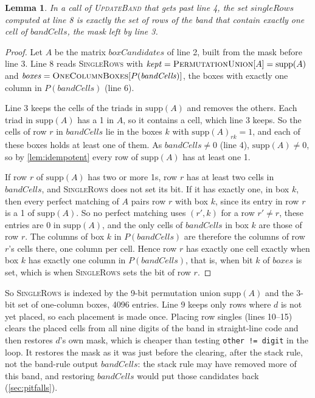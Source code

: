 \documentclass[11pt]{article}
\newtheorem{lemma}[theorem]{Lemma}
\theoremstyle{definition}
\theoremstyle{plain}
\let\origtextsc\textsc
\renewcommand{\textsc}[1]{\textup{\origtextsc{#1}}}
\begin{document}
\begin{lemma}
\label{lem:singlerows}
In a call of \textsc{UpdateBand} that gets past line 4, the set $\mathit{singleRows}$ computed at line 8 is exactly the
set of rows of the band that contain exactly one cell of $\mathit{bandCells}$, the mask left by line 3.
\end{lemma}
\begin{proof}
Let $A$ be the matrix $\mathit{boxCandidates}$ of line 2, built from the mask before line 3. Line 8 reads
\textsc{SingleRows} with $\mathit{kept}=\textsc{PermutationUnion}[A]=\mathrm{supp}(A)$ and
$\mathit{boxes}=\textsc{OneColumnBoxes}[P(\mathit{bandCells})]$, the boxes with exactly one column in
$P(\mathit{bandCells})$ (line 6).

Line 3 keeps the cells of the triads in $\mathrm{supp}(A)$ and removes the others. Each triad in $\mathrm{supp}(A)$ has
a 1 in $A$, so it contains a cell, which line 3 keeps. So the cells of row $r$ in $\mathit{bandCells}$ lie in the boxes
$k$ with $\mathrm{supp}(A)_{rk}=1$, and each of these boxes holds at least one of them. As $\mathit{bandCells}\neq 0$
(line 4), $\mathrm{supp}(A)\neq 0$, so by \cref{lem:idempotent} every row of $\mathrm{supp}(A)$ has at least one 1.

If row $r$ of $\mathrm{supp}(A)$ has two or more 1s, row $r$ has at least two cells in $\mathit{bandCells}$, and
\textsc{SingleRows} does not set its bit. If it has exactly one, in box $k$, then every perfect matching of $A$ pairs
row $r$ with box $k$, since its entry in row $r$ is a 1 of $\mathrm{supp}(A)$. So no perfect matching uses $(r',k)$
for a row $r'\neq r$, these entries are 0 in $\mathrm{supp}(A)$, and the only cells of $\mathit{bandCells}$ in box $k$
are those of row $r$. The columns of box $k$ in $P(\mathit{bandCells})$ are therefore the columns of row $r$'s cells
there, one column per cell. Hence row $r$ has exactly one cell exactly when box $k$ has exactly one column in
$P(\mathit{bandCells})$, that is, when bit $k$ of $\mathit{boxes}$ is set, which is when \textsc{SingleRows} sets the
bit of row $r$.
\end{proof}

\noindent So \textsc{SingleRows} is indexed by the 9-bit permutation union $\mathrm{supp}(A)$ and the 3-bit set of one-column boxes, 4096
entries. Line 9 keeps only rows where $d$ is not yet placed, so each placement is made once. Placing row singles (lines 10--15) clears the placed cells from all nine digits of the band in straight-line code and
then restores $d$'s own mask, which is cheaper than testing \texttt{other != digit} in the loop. It restores the mask
as it was just before the clearing, after the stack rule, not the band-rule output $\mathit{bandCells}$: the stack rule
may have removed more of this band, and restoring $\mathit{bandCells}$ would put those candidates back (\cref{sec:pitfalls}).
\end{document}

